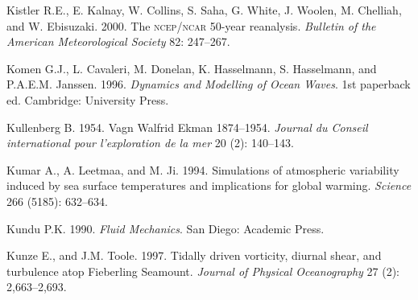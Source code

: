 \begin{thebibliography}{999}
Kistler R.E., E. Kalnay, W. Collins, S. Saha, G. White, J. Woolen, M.
Chelliah, and W. Ebisuzaki. 2000. The \textsc{ncep/ncar} 50-year
reanalysis.  \textit{Bulletin of the American Meteorological Society}
82: 247--267.
%

Komen G.J., L. Cavaleri, M. Donelan, K. Hasselmann, S. Hasselmann, and
P.A.E.M. Jans\-sen. 1996. \textit{Dynamics and Modelling of Ocean
  Waves}. 1st paperback ed.  Cambridge: University Press.
%

Kullenberg B.  1954. Vagn Walfrid Ekman 1874--1954. \textit{Journal du
  Conseil international pour l'exploration de la mer} 20 (2):
140--143.
%

Kumar A., A. Leetmaa, and M. Ji.  1994. Simulations of atmospheric
variability induced by sea surface temperatures and implications for
global warming. \textit{Science} 266 (5185): 632--634.
%

Kundu P.K.  1990. \textit{Fluid Mechanics}. San Diego: Academic Press.
%

Kunze E., and J.M. Toole.  1997. Tidally driven vorticity, diurnal
shear, and turbulence atop Fieberling Seamount. \textit{Journal of
  Physical Oceanography} 27 (2): 2,663--2,693.
%


\end{thebibliography}
